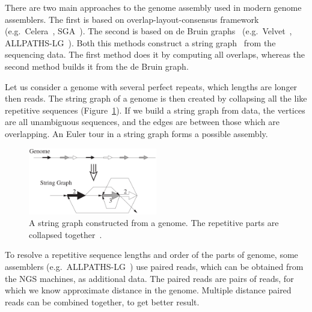 There are two main approaches to the genome assembly used in modern genome assemblers. The first is based on overlap-layout-consensus framework (e.g.\ Celera~\cite{myers2000celera}, SGA~\cite{simpson2010sga}). The second is based on de Bruin graphs~\cite{deBruijn} (e.g.\ Velvet~\cite{zerbino2008velvet}, ALLPATHS-LG~\cite{gnerre2011allpaths}). Both this methods construct a string graph~\cite{myers2005stringgraph} from the sequencing data. The first method does it by computing all overlaps, whereas the second method builds it from the de Bruin graph.

Let us consider a genome with several perfect repeats, which lengths are longer then reads. The string graph of a genome is then created by collapsing all the like repetitive sequences (Figure~\ref{fig:string-graph}). If we build a string graph from data, the vertices are all unambiguous sequences, and the edges are between those which are overlapping. An Euler tour in a string graph forms a possible assembly.

\begin{figure}[htbp]
  \centering
  \includegraphics[width=0.5\textwidth]{../figures/string-graph.png}
  \caption[String graph]{A string graph constructed from a genome. The repetitive parts are collapsed together~\cite{myers2005stringgraph}.}\label{fig:string-graph}
\end{figure}

To resolve a repetitive sequence lengths and order of the parts of genome, some assemblers  (e.g.\ ALLPATHS-LG~\cite{gnerre2011allpaths}) use paired reads, which can be obtained from the NGS machines, as additional data. The paired reads are pairs of reads, for which we know approximate distance in the genome. Multiple distance paired reads can be combined together, to get better result.
